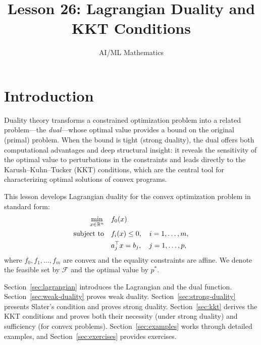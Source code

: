 \documentclass[11pt,a4paper]{article}
\title{Lesson 26: Lagrangian Duality and KKT Conditions}
\author{AI/ML Mathematics}
\date{}
\begin{document}
\maketitle
\tableofcontents
\newpage


\section{Introduction}\label{sec:intro}

Duality theory transforms a constrained optimization problem into a related
problem---the \emph{dual}---whose optimal value provides a bound on the original
(primal) problem. When the bound is tight (strong duality), the dual offers both
computational advantages and deep structural insight: it reveals the
sensitivity of the optimal value to perturbations in the constraints and leads
directly to the Karush--Kuhn--Tucker (KKT) conditions, which are the central
tool for characterizing optimal solutions of convex programs.

This lesson develops Lagrangian duality for the convex optimization
problem in standard form:
\begin{equation}\label{eq:std-form}
\begin{aligned}
  \min_{x \in \mathbb{R}^n} \quad & f_0(x) \\
  \text{subject to} \quad & f_i(x) \le 0, \quad i = 1,\dots,m, \\
                          & a_j^\top x = b_j, \quad j = 1,\dots,p,
\end{aligned}
\end{equation}
where $f_0, f_1, \dots, f_m$ are convex and the equality constraints are
affine. We denote the feasible set by $\mathcal{F}$ and the optimal value
by $p^*$.

Section~\ref{sec:lagrangian} introduces the Lagrangian and the dual function.
Section~\ref{sec:weak-duality} proves weak duality.
Section~\ref{sec:strong-duality} presents Slater's condition and proves strong
duality. Section~\ref{sec:kkt} derives the KKT conditions and proves both
their necessity (under strong duality) and sufficiency (for convex problems).
Section~\ref{sec:examples} works through detailed examples, and
Section~\ref{sec:exercises} provides exercises.

\end{document}

